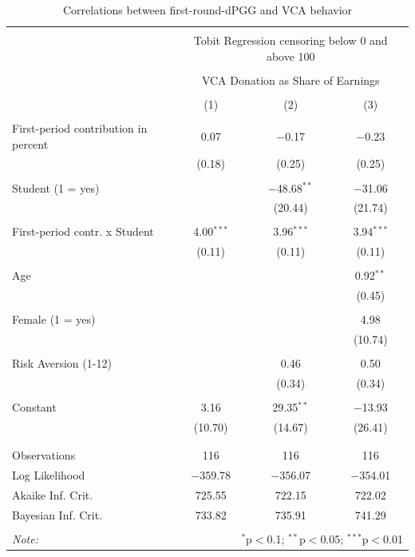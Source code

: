 \documentclass[
  authoryear,
  preprint,
  3p]{elsarticle}
\begin{document}
\hypertarget{tbl-tobit-generalizability}{}
\begin{table}[!htbp] \centering 
  \caption{\label{tbl-tobit-generalizability}Correlations between first-round-dPGG and VCA behavior } 
  \label{} 
\begin{tabular}{@{\extracolsep{5pt}}lccc} 
\\[-1.8ex]\hline 
\hline \\[-1.8ex] 
 & \multicolumn{3}{c}{Tobit Regression censoring below 0 and above 100} \\ 
\cline{2-4} 
\\[-1.8ex] & \multicolumn{3}{c}{VCA Donation as Share of Earnings} \\ 
\\[-1.8ex] & (1) & (2) & (3)\\ 
\hline \\[-1.8ex] 
 First-period contribution in percent & 0.07 & $-$0.17 & $-$0.23 \\ 
  & (0.18) & (0.25) & (0.25) \\ 
  & & & \\ 
 Student (1 = yes) &  & $-$48.68$^{**}$ & $-$31.06 \\ 
  &  & (20.44) & (21.74) \\ 
  & & & \\ 
 First-period contr. x Student & 4.00$^{***}$ & 3.96$^{***}$ & 3.94$^{***}$ \\ 
  & (0.11) & (0.11) & (0.11) \\ 
  & & & \\ 
 Age &  &  & 0.92$^{**}$ \\ 
  &  &  & (0.45) \\ 
  & & & \\ 
 Female (1 = yes) &  &  & 4.98 \\ 
  &  &  & (10.74) \\ 
  & & & \\ 
 Risk Aversion (1-12) &  & 0.46 & 0.50 \\ 
  &  & (0.34) & (0.34) \\ 
  & & & \\ 
 Constant & 3.16 & 29.35$^{**}$ & $-$13.93 \\ 
  & (10.70) & (14.67) & (26.41) \\ 
  & & & \\ 
\hline \\[-1.8ex] 
Observations & 116 & 116 & 116 \\ 
Log Likelihood & $-$359.78 & $-$356.07 & $-$354.01 \\ 
Akaike Inf. Crit. & 725.55 & 722.15 & 722.02 \\ 
Bayesian Inf. Crit. & 733.82 & 735.91 & 741.29 \\ 
\hline 
\hline \\[-1.8ex] 
\textit{Note:}  & \multicolumn{3}{r}{$^{*}$p$<$0.1; $^{**}$p$<$0.05; $^{***}$p$<$0.01} \\ 
\end{tabular} 
\end{table}
\end{document}
